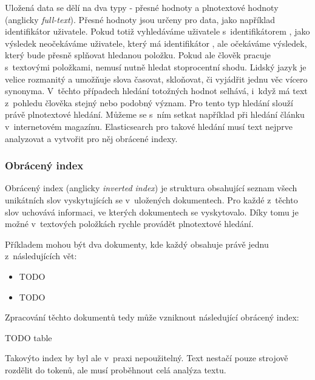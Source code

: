 Uložená data se dělí na dva typy - přesné hodnoty a plnotextové hodnoty (anglicky \emph{full-text}). Přesné hodnoty jsou určeny pro data, jako například identifikátor uživatele. Pokud totiž vyhledáváme uživatele s~identifikátorem , jako výsledek neočekáváme uživatele, který má identifikátor , ale očekáváme výsledek, který bude přesně splňovat hledanou položku.
Pokud ale člověk pracuje s~textovými položkami, nemusí nutně hledat stoprocentní shodu. Lidský jazyk je velice rozmanitý a umožňuje slova časovat, skloňovat, či vyjádřit jednu věc vícero synonyma. %
V~těchto případech hledání totožných hodnot selhává, i~když má text z~pohledu člověka stejný nebo podobný význam. Pro tento typ hledání slouží právě plnotextové hledání. Můžeme se s~ním setkat například při hledání článku v~internetovém magazínu.
Elasticsearch pro takové hledání musí text nejprve analyzovat a vytvořit pro něj obrácené indexy.

\subsubsection*{Obrácený index}
Obrácený index (anglicky \emph{inverted index}) je struktura obsahující seznam všech unikátních slov vyskytujících se v~uložených dokumentech. Pro každé z~těchto slov uchovává informaci, ve kterých dokumentech se vyskytovalo. Díky tomu je možné v~textových položkách rychle provádět plnotextové hledání.

Příkladem mohou být dva dokumenty, kde každý obsahuje právě jednu z~následujících vět:
\begin{itemize}
    \item TODO
    \item TODO
\end{itemize}
Zpracování těchto dokumentů tedy může vzniknout následující obrácený index:

TODO table

Takovýto index by byl ale v~praxi nepoužitelný. Text nestačí pouze strojově rozdělit do tokenů, ale musí proběhnout celá analýza textu.

